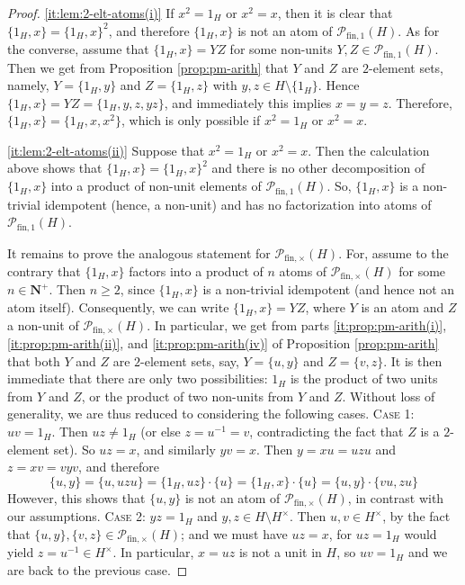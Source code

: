\documentclass{report}
\renewcommand{\P}{\mathcal{P}}
\newcommand{\fin}{\textrm{fin}}
\newcommand{\funt}{{\textrm{fin}, \times}}
\newcommand{\fun}{{\textrm{fin}, 1}}
\renewcommand{\:}{\text{:}}
\theoremstyle{definition}
\begin{document}
\begin{proof}
	\ref{it:lem:2-elt-atoms(i)} If $x^2 = 1_H$ or $x^2 = x$, then it is clear that $\{1_H,x\} = \{1_H,x\}^2$, and therefore $\{1_H,x\}$ is not an atom of $\mathcal P_\fun(H)$. As for the converse, assume that $\{1_H,x\} = YZ$ for some non-units $Y,Z \in \mathcal P_\fun(H)$. Then we get from Proposition \ref{prop:pm-arith} that $Y$ and $Z$ are $2$-element sets, namely, $Y = \{1_H, y\}$ and $Z = \{1_H, z\}$ with $y,z \in H \setminus \{1_H\}$. Hence $\{1_H,x\} = YZ = \{1_H,y,z,yz\}$, and immediately this implies $x=y=z$. Therefore, $\{1_H,x\} = \{1_H,x,x^2\}$, which is only possible if $x^2 = 1_H$ or $x^2 = x$.
	
	\ref{it:lem:2-elt-atoms(ii)} Suppose that $x^2 = 1_H$ or $x^2 = x$. Then the calculation above shows that $\{1_H,x\} = \{1_H,x\}^2$ and there is no other decomposition of $\{1_H,x\}$ into a product of non-unit elements of $\mathcal P_{\fin,1}(H)$. So, $\{1_H,x\}$ is a non-trivial idempotent (hence, a non-unit) and has no factorization into atoms of $\mathcal P_{\fin,1}(H)$.
	
	It remains to prove the analogous statement for $\mathcal P_{\fin,\times}(H)$.
	For, assume to the contrary that $\{1_H,x\}$ factors into a product of $n$ atoms of $\mathcal P_{\fin,\times}(H)$ for some $n \in \mathbf N^+$. Then $n \ge 2$, since $\{1_H, x\}$ is a non-trivial idempotent (and hence not an atom itself). Consequently, we can write $\{1_H,x\} = YZ$, where $Y$ is an atom and $Z$ a non-unit of $\mathcal P_{\fin,\times}(H)$. In particular, we get from parts \ref{it:prop:pm-arith(i)}, \ref{it:prop:pm-arith(ii)}, and \ref{it:prop:pm-arith(iv)} of Proposition \ref{prop:pm-arith} that both $Y$ and $Z$ are $2$-element sets, say, $Y = \{u, y\}$ and $Z = \{v, z\}$. It is then immediate that there are only two possibilities: $1_H$ is the product of two units from $Y$ and $Z$, or the product of two non-units from $Y$ and $Z$.
	Without loss of generality, we are thus reduced to considering the following cases.
	\vskip 0.1cm
	\textsc{Case 1:} $uv=1_H$. Then $uz \ne 1_H$ (or else $z = u^{-1} = v$, contradicting the fact that $Z$ is a $2$-element set). So $uz=x$, and similarly $yv=x$. Then $y = xu = uzu$ and $z = xv = vyv$, and therefore
	\[
	\{u,y\} = \{u,uzu\} = \{1_H,uz\}\cdot \{u\} = \{1_H,x\}\cdot\{u\} = \{u,y\}\cdot \{vu,zu\}
	\]
	However, this shows that $\{u,y\}$ is not an atom of $\P_\funt(H)$, in contrast with our assumptions.
	\vskip 0.1cm
	\textsc{Case 2:}
	$yz = 1_H$ and $y,z\in H\setminus H^\times$. Then $u,v\in H^\times$, by the fact that $\{u, y\}, \{v, z\} \in \mathcal P_{\fin,\times}(H)$; and we must have $uz=x$, for $uz=1_H$ would yield $z = u^{-1}\in H^\times$.
	In particular, $x = uz$ is not a unit in $H$, so $uv=1_H$ and we are back to the previous case.
\end{proof}
\end{document}
